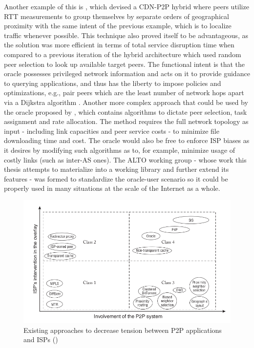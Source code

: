 \begin{itemize}
        Another example of this is \cite{kim2011}, which devised a CDN-P2P hybrid where peers utilize RTT measurements to group themselves by separate orders of geographical proximity with the same intent of the previous example, which is to localize traffic whenever possible.
        This technique also proved itself to be advantageous, as the solution was more efficient in terms of total service disruption time when compared to a previous iteration of the hybrid architecture which used random peer selection to look up available target peers.
        The functional intent is that the oracle possesses privileged network information and acts on it to provide guidance to querying applications, and thus has the liberty to impose policies and optimizations, e.g., pair peers which are the least number of network hops apart via a Dijkstra algorithm .
        Another more complex approach that could be used by the oracle proposed by \cite{han2009}, which contains algorithms to dictate peer selection, task assignment and rate allocation.
        The method requires the full network topology as input - including link capacities and peer service costs - to minimize file downloading time and cost.
        The oracle would also be free to enforce ISP biases as it desires by modifying such algorithms as to, for example, minimize usage of costly links (such as inter-AS ones).
        The ALTO working group - whose work this thesis attempts to materialize into a working library and further extend its features - was formed to standardize the oracle-user scenario so it could be properly used in many situations at the scale of the Internet as a whole.

\end{itemize}

\begin{figure}[!h]
\centering
\includegraphics[scale=0.65]{img/approaches-isp-p2p.png}
\caption{Existing approaches to decrease tension between P2P applications and ISPs (\cite{dan-Commag10})}
\label{fig:p2p-isp-interactions}
\end{figure}

